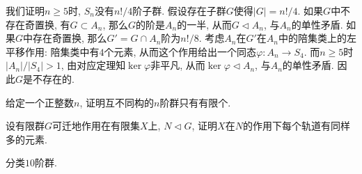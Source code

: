 \begin{eg}
    我们证明$n\geq 5$时, $S_n$没有$n!/4$阶子群.
    假设存在子群$G$使得$|G|=n!/4$.
    如果$G$中不存在奇置换, 有$G\subset A_n$, 那么$G$的阶是$A_n$的一半, 从而$G\lhd A_n$, 与$A_n$的单性矛盾.
    如果$G$中存在奇置换, 那么$G'=G\cap A_n$阶为$n!/8$.
    考虑$A_n$在$G'$在$A_n$中的陪集类上的左平移作用: 陪集类中有$4$个元素, 从而这个作用给出一个同态$\varphi:A_n\to S_4$.
    而$n\geq 5$时$|A_n|/|S_4|>1$, 由对应定理知$\ker\varphi$非平凡, 从而$\ker\varphi\lhd A_n$, 与$A_n$的单性矛盾.
    因此$G$是不存在的.
\end{eg}

\begin{ex}
    给定一个正整数$n$, 证明互不同构的$n$阶群只有有限个.
\end{ex}

\begin{ex}
    设有限群$G$可迁地作用在有限集$X$上, $N\lhd G$, 证明$X$在$N$的作用下每个轨道有同样多的元素.
\end{ex}

\begin{ex}
    分类$10$阶群.
\end{ex}